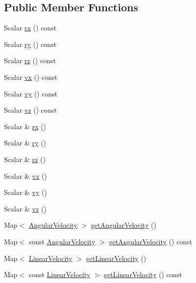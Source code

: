 \subsection*{Public Member Functions}
\begin{DoxyCompactItemize}
\item 
Scalar \hyperlink{class_twist_base_a894919d086a24def57622d7e151a58c2}{rx} () const
\item 
Scalar \hyperlink{class_twist_base_a649f10b163fa68cd901aa3ee412ced7f}{ry} () const
\item 
Scalar \hyperlink{class_twist_base_a25f415854bcf537c8aa1cc244bfdb770}{rz} () const
\item 
Scalar \hyperlink{class_twist_base_a323021f263783da2d5b275552858ab67}{vx} () const
\item 
Scalar \hyperlink{class_twist_base_a2cf70ed359f60d07610e8ab36910f436}{vy} () const
\item 
Scalar \hyperlink{class_twist_base_a217ab4d995e5c40b24a586278301415e}{vz} () const
\item 
Scalar \& \hyperlink{class_twist_base_a9622270eb8e0f450bce5b356ee10f205}{rx} ()
\item 
Scalar \& \hyperlink{class_twist_base_a43c3b5462cb4f4b71283e29871b89cd1}{ry} ()
\item 
Scalar \& \hyperlink{class_twist_base_a0ca49c0005a9a87ddebd2e3892687529}{rz} ()
\item 
Scalar \& \hyperlink{class_twist_base_a8d4de5b2cf8cfdeab7146777cbeec798}{vx} ()
\item 
Scalar \& \hyperlink{class_twist_base_aea73eb77920e10bfdbc01cc1fd7956f8}{vy} ()
\item 
Scalar \& \hyperlink{class_twist_base_a169c415ee48933c6820131d211b38eac}{vz} ()
\item 
Map$<$ \hyperlink{class_twist_base_ad0bc13debe8afc170da877cebe4dc45f}{Angular\+Velocity} $>$ \hyperlink{class_twist_base_a9574d52bbded5a52ee8ae7d69f462c1b}{get\+Angular\+Velocity} ()
\item 
Map$<$ const \hyperlink{class_twist_base_ad0bc13debe8afc170da877cebe4dc45f}{Angular\+Velocity} $>$ \hyperlink{class_twist_base_ab6e1055a88a9d729290272d62b7bb128}{get\+Angular\+Velocity} () const
\item 
Map$<$ \hyperlink{class_twist_base_aeafbc7a3ca37e08812be0af7e680190b}{Linear\+Velocity} $>$ \hyperlink{class_twist_base_a8056931a50cd7fa4f0d75f70470b0907}{get\+Linear\+Velocity} ()
\item 
Map$<$ const \hyperlink{class_twist_base_aeafbc7a3ca37e08812be0af7e680190b}{Linear\+Velocity} $>$ \hyperlink{class_twist_base_ae0ea0ad07e9f5547cd18a8f6eb953792}{get\+Linear\+Velocity} () const

\end{DoxyCompactItemize}
